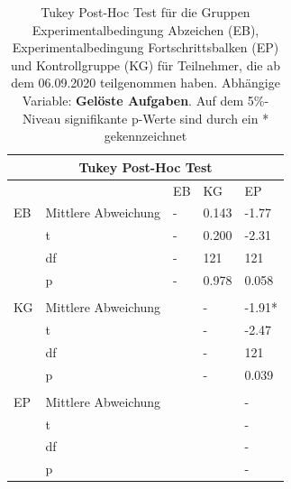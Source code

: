 \begin{table}[htbp]
\centering
\begin{tabular}{ p{2cm} p{4cm} p{2.0cm} p{2.0cm} p{2.0cm} }
 \hline
 \multicolumn{5}{c}{Tukey Post-Hoc Test} \\
 \hline
 & & EB & KG & EP \\
 \hline
  EB    &   Mittlere Abweichung     & -     & 0.143     & -1.77     \\
        &   t                       & -     & 0.200     & -2.31     \\
        &   df                      & -     & 121       & 121       \\
        &   p                       & -     & 0.978     & 0.058     \\
  & & & &\\
  KG    &   Mittlere Abweichung     &       & -         & -1.91*    \\
        &   t                       &       & -         & -2.47     \\
        &   df                      &       & -         & 121       \\
        &   p                       &       & -         & 0.039     \\
  & & & &\\
  EP    &   Mittlere Abweichung     &       &           & -     \\
        &   t                       &       &           & -     \\
        &   df                      &       &           & -     \\
        &   p                       &       &           & -     \\
  
 \hline
\end{tabular}
\caption{Tukey Post-Hoc Test für die Gruppen Experimentalbedingung Abzeichen (EB), Experimentalbedingung Fortschrittsbalken (EP) und Kontrollgruppe (KG) für Teilnehmer, die ab dem 06.09.2020 teilgenommen haben. Abhängige Variable: \textbf{Gelöste Aufgaben}. Auf dem 5\%-Niveau signifikante p-Werte sind durch ein * gekennzeichnet}
\label{tukey_final}
\end{table}
